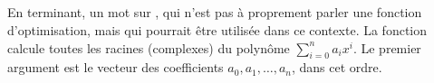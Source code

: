\subsection{}
\label{optimisation:fonctions:polyroot}

En terminant, un mot sur , qui n'est pas à proprement
parler une fonction d'optimisation, mais qui pourrait être utilisée
dans ce contexte. La fonction  calcule toutes les
racines (complexes) du polynôme
$\sum_{i=0}^n a_i x^i$. Le premier argument est le vecteur des
coefficients $a_0, a_1, \dots, a_n$, dans cet ordre.

